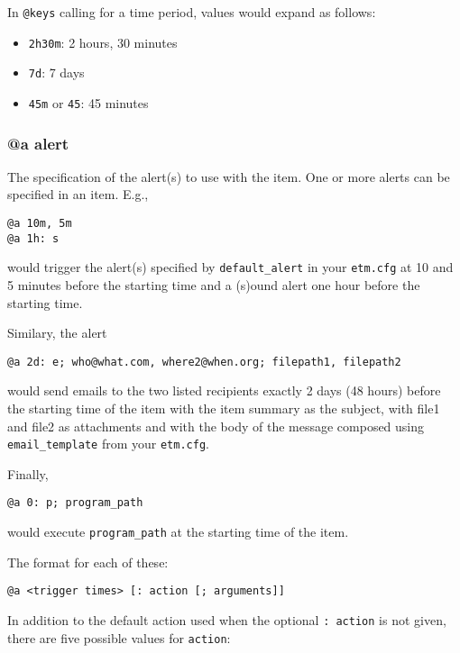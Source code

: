 \documentclass[]{article}
\begin{document}
In \texttt{@keys} calling for a time period, values would expand as
follows:

\begin{itemize}
\item
  \texttt{2h30m}: 2 hours, 30 minutes
\item
  \texttt{7d}: 7 days
\item
  \texttt{45m} or \texttt{45}: 45 minutes
\end{itemize}

\subsubsection{@a alert}

The specification of the alert(s) to use with the item. One or more
alerts can be specified in an item. E.g.,

\begin{verbatim}
@a 10m, 5m
@a 1h: s
\end{verbatim}

would trigger the alert(s) specified by \texttt{default\_alert} in your
\texttt{etm.cfg} at 10 and 5 minutes before the starting time and a
(s)ound alert one hour before the starting time.

Similary, the alert

\begin{verbatim}
@a 2d: e; who@what.com, where2@when.org; filepath1, filepath2
\end{verbatim}

would send emails to the two listed recipients exactly 2 days (48 hours)
before the starting time of the item with the item summary as the
subject, with file1 and file2 as attachments and with the body of the
message composed using \texttt{email\_template} from your
\texttt{etm.cfg}.

Finally,

\begin{verbatim}
@a 0: p; program_path
\end{verbatim}

would execute \texttt{program\_path} at the starting time of the item.

The format for each of these:

\begin{verbatim}
@a <trigger times> [: action [; arguments]]
\end{verbatim}

In addition to the default action used when the optional
\texttt{: action} is not given, there are five possible values for
\texttt{action}:
\end{document}
